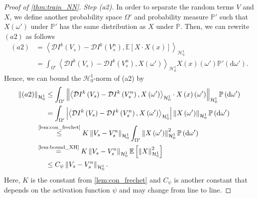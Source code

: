 \documentclass[11pt,a4paper,reqno]{amsart}
\numberwithin{equation}{section}
\theoremstyle{plain}
\theoremstyle{definition}
\def\ud{\mathrm d}
\def\red{\color{red}}
\newcommand{\ip}[1]{\left\langle#1\right\rangle}
\newcommand{\p}{\mathbb{P}}
\newcommand{\E}{\mathbb{E}}
\newcommand{\cH}{\mathcal{H}}
\newcommand{\norm}[1]{\left\|#1 \right\|} %
\newcommand{\abs}[1]{\left|#1\right|} %
\begin{document}
\begin{proof}[Proof of \cref{thm:train_NN}]
\noindent\textit{Step (a2).}
In order to separate the random terms $V$ and $X$, we define another probability space $\Omega'$ and probability measure $\p'$ such that $X\left(\omega'\right)$ under $\p'$ has the same distribution as $X$ under $\p.$ 
Then, we can rewrite $(a2)$ as follows
\begin{align*}
(a2)
    &= \ip{\mathcal{D}I^k \left( V_s \right) - \mathcal{D}I^k \left( V^n_s \right), \E\left[X\cdot X\left(x\right)\right]}_{\cH_0^1} \\
    &= \int_{\Omega'}\ip{\mathcal{D}I^k \left( V_s \right) - \mathcal{D}I^k \left( V^n_s \right), X\left(\omega'\right)}_{\cH_0^1} X \left(x\right)\left(\omega'\right) \p' \left( \ud \omega' \right). 
\end{align*}
Hence, we can bound the $\cH_0^1$-norm of (a2) by
\begin{align*}
\norm{(a2)}_{\cH_0^1} 
    &\le \int_{\Omega'} \norm{\ip{\mathcal{D}I^k \left( V_s \right) - \mathcal{D}I^k \left( V^n_s \right), X\left(\omega'\right)}_{\cH_0^1} \cdot X\left(x\right)\left(\omega'\right)}_{\cH_0^1} \p \left( \ud \omega' \right) \\
    &= \int_{\Omega'}\abs{\ip{\mathcal{D}I^k \left( V_s \right) - \mathcal{D}I^k \left( V^n_s \right), X\left(\omega'\right)}_{\cH_0^1}} \norm{ X\left(\omega'\right)}_{\cH_0^1} \p \left( \ud \omega' \right) \\
    &\hspace{-1.35em}\overset{\text{\cref{lem:con_frechet}}}{\le} K \norm{V_s - V_s^n}_{\cH_0^1} \int_{\Omega'} \norm{ X\left(\omega'\right)}_{\cH_0^1}^2 \p \left( \ud \omega' \right) \\
    &\hspace{-1.35em}\overset{\text{\cref{lem:bound_XH}}}{=} K \norm{V_s - V_s^n}_{\cH_0^1} \E\left[\norm{ X}_{\cH_0^1}^2\right] \\
    &\le C_\psi \norm{V_s - V_s^n}_{\cH_0^1}.
\end{align*}
Here, $K$ is the constant from \cref{lem:con_frechet} and $C_\psi$ is another constant that depends on the activation function $\psi$ and may change from line to line.




\end{proof}
\end{document}
